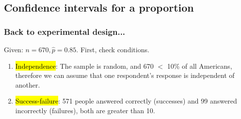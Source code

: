 %
%
%
%
%

\subsection{Confidence intervals for a proportion}


\begin{frame}
\frametitle{Back to experimental design...}


\pause
Given: $n = 670, \hat{p} = 0.85$. First, check conditions.

\pause
\begin{enumerate}[1.]
\item \hl{Independence}: The sample is random, and 670 $<$ 10\% of all Americans, therefore we can assume that one respondent's response is independent of another.
\pause
\item \hl{Success-failure}: 571 people answered correctly (successes) and 99 answered incorrectly (failures), both are greater than 10.
\end{enumerate}

\end{frame}

